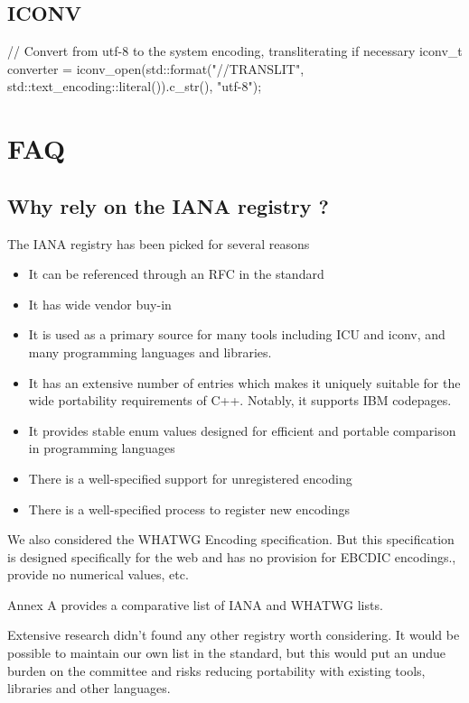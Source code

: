 \documentclass{wg21}
\begin{document}
\subsection{ICONV}

\begin{colorblock}
// Convert from utf-8 to the system encoding, transliterating if necessary
iconv_t converter 
    = iconv_open(std::format("{}//TRANSLIT", std::text_encoding::literal()).c_str(), "utf-8");
\end{colorblock}


\section{FAQ}

\subsection{Why rely on the IANA registry ?}

The IANA registry has been picked for several reasons

\begin{itemize}
\item It can be referenced through an RFC in the standard
\item It has wide vendor buy-in
\item It is used as a primary source for many tools including ICU and iconv, and many programming languages and libraries.
\item It has an extensive number of entries which makes it uniquely suitable for the wide portability requirements of C++. Notably, it supports IBM codepages.
\item It provides stable enum values designed for efficient and portable comparison in programming languages
\item There is a well-specified support for unregistered encoding
\item There is a well-specified process to register new encodings
\end{itemize}

We also considered the WHATWG Encoding specification. But this specification is designed specifically for the web
and has no provision for EBCDIC encodings., provide no numerical values, etc.

Annex A provides a comparative list of IANA and WHATWG lists.

Extensive research didn't found any other registry worth considering.
It would be possible to maintain our own list in the standard, but this would put an undue burden on the committee and
risks reducing portability with existing tools, libraries and other languages.
\end{document}
